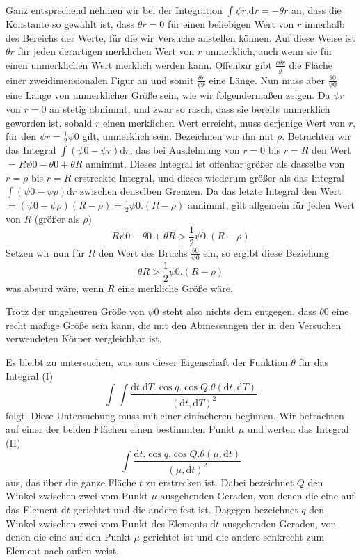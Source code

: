 Ganz entsprechend nehmen wir bei der Integration $\int\psi r.\mathrm{d}r=-\theta r$ an, dass die Konstante so gewählt ist, dass $\theta r=0$ für einen beliebigen Wert von $r$ innerhalb des Bereichs der Werte, für die wir Versuche anstellen können. Auf diese Weise ist $\theta r$ für jeden derartigen merklichen Wert von $r$ unmerklich, auch wenn sie für einen unmerklichen Wert merklich werden kann. Offenbar gibt $\frac{c\theta r}{g}$ die Fläche einer zweidimensionalen Figur an und somit $\frac{\theta r}{\psi r}$ eine Länge. Nun muss aber $\frac{\theta0}{\psi0}$ eine Länge von unmerklicher Größe sein, wie wir folgendermaßen zeigen. Da $\psi r$ von $r=0$ an stetig abnimmt, und zwar so rasch, dass sie bereits unmerklich geworden ist, sobald $r$ einen merklichen Wert erreicht, muss derjenige Wert von $r$, für den $\psi r=\frac12\psi0$ gilt, unmerklich sein. Bezeichnen wir ihn mit $\rho$. Betrachten wir das Integral $\int(\psi0-\psi r)\mathrm{d}r$, das bei Ausdehnung von $r=0$ bis $r=R$ den Wert $=R\psi0-\theta0+\theta R$ annimmt. Dieses Integral ist offenbar größer als dasselbe von $r=\rho$ bis $r=R$ erstreckte Integral, und dieses wiederum größer als das Integral $\int(\psi0-\psi\rho)\mathrm{d}r$ zwischen denselben Grenzen. Da das letzte Integral den Wert $=(\psi0-\psi\rho)(R-\rho)=\frac12\psi0.(R-\rho)$ annimmt, gilt allgemein für jeden Wert von $R$ (größer als $\rho$)
\[
R\psi0-\theta0+\theta R>\frac12\psi0.(R-\rho)
\]
Setzen wir nun für $R$ den Wert des Bruchs $\frac{\theta0}{\psi0}$ ein, so ergibt diese Beziehung
\[
\theta R>\frac12\psi0.(R-\rho)
\]
was absurd wäre, wenn $R$ eine merkliche Größe wäre.

Trotz der ungeheuren Größe von $\psi0$ steht also nichts dem entgegen, dass $\theta0$ eine recht mäßige Größe sein kann, die mit den Abmessungen der in den Versuchen verwendeten Körper vergleichbar ist.

Es bleibt zu untersuchen, was aus dieser Eigenschaft der Funktion $\theta$ für das Integral (I)
\[
\int\int\frac{\mathrm{d}t.\mathrm{d}T.\cos q.\cos Q.\theta(\mathrm{d}t,\mathrm{d}T)}{(\mathrm{d}t,\mathrm{d}T)^2}
\]
folgt. Diese Untersuchung muss mit einer einfacheren beginnen. Wir betrachten auf einer der beiden Flächen einen bestimmten Punkt $\mu$ und werten das Integral (II)
\[
\int\frac{\mathrm{d}t.\cos q.\cos Q.\theta(\mu,\mathrm{d}t)}{(\mu,\mathrm{d}t)^2}
\]
aus, das über die ganze Fläche $t$ zu erstrecken ist. Dabei bezeichnet $Q$ den Winkel zwischen zwei vom Punkt $\mu$ ausgehenden Geraden, von denen die eine auf das Element $\mathrm{d}t$ gerichtet und die andere fest ist. Dagegen bezeichnet $q$ den Winkel zwischen zwei vom Punkt des Elements $\mathrm{d}t$ ausgehenden Geraden, von denen die eine auf den Punkt $\mu$ gerichtet ist und die andere senkrecht zum Element nach außen weist.

